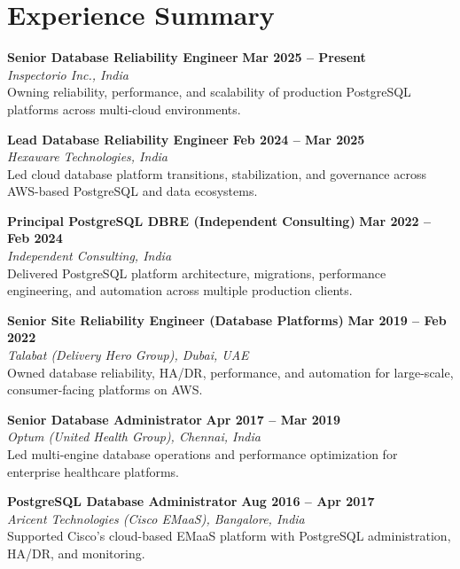 \documentclass[10pt,a4paper]{article}
\begin{document}
\section{Experience Summary}

\noindent
\textbf{Senior Database Reliability Engineer} \hfill \textbf{Mar 2025 -- Present} \\
\emph{Inspectorio Inc., India} \\
Owning reliability, performance, and scalability of production PostgreSQL platforms across multi-cloud environments.

\vspace{3pt}
\noindent
\textbf{Lead Database Reliability Engineer} \hfill \textbf{Feb 2024 -- Mar 2025} \\
\emph{Hexaware Technologies, India} \\
Led cloud database platform transitions, stabilization, and governance across AWS-based PostgreSQL and data ecosystems.

\vspace{3pt}
\noindent
\textbf{Principal PostgreSQL DBRE (Independent Consulting)} \hfill \textbf{Mar 2022 -- Feb 2024} \\
\emph{Independent Consulting, India} \\
Delivered PostgreSQL platform architecture, migrations, performance engineering, and automation across multiple production clients.

\vspace{3pt}
\noindent
\textbf{Senior Site Reliability Engineer (Database Platforms)} \hfill \textbf{Mar 2019 -- Feb 2022} \\
\emph{Talabat (Delivery Hero Group), Dubai, UAE} \\
Owned database reliability, HA/DR, performance, and automation for large-scale, consumer-facing platforms on AWS.

\vspace{3pt}
\noindent
\textbf{Senior Database Administrator} \hfill \textbf{Apr 2017 -- Mar 2019} \\
\emph{Optum (United Health Group), Chennai, India} \\
Led multi-engine database operations and performance optimization for enterprise healthcare platforms.

\vspace{3pt}
\noindent
\textbf{PostgreSQL Database Administrator} \hfill \textbf{Aug 2016 -- Apr 2017} \\
\emph{Aricent Technologies (Cisco EMaaS), Bangalore, India} \\
Supported Cisco's cloud-based EMaaS platform with PostgreSQL administration, HA/DR, and monitoring.
\end{document}
